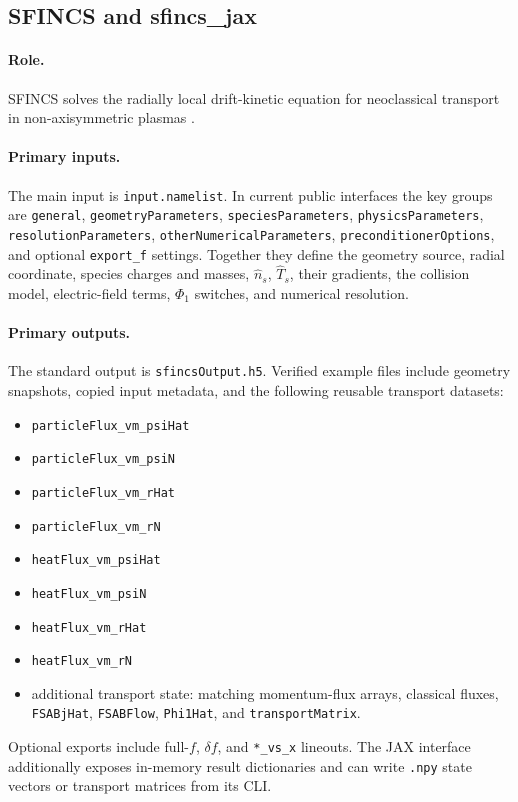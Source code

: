 \documentclass[11pt]{article}
\newcommand{\code}[1]{\texttt{#1}}
\begin{document}
\subsection{SFINCS and sfincs\_jax}

\paragraph{Role.}
SFINCS solves the radially local drift-kinetic equation for neoclassical
transport in non-axisymmetric plasmas \citep{Landreman2014SFINCS,Mollen2018,SFINCSRepo,SFINCSJaxRepo}.

\paragraph{Primary inputs.}
The main input is \code{input.namelist}. In current public interfaces the key
groups are \code{general}, \code{geometryParameters},
\code{speciesParameters}, \code{physicsParameters},
\code{resolutionParameters}, \code{otherNumericalParameters},
\code{preconditionerOptions}, and optional \code{export\_f} settings. Together
they define the geometry source, radial coordinate, species charges and masses,
\(\hat n_s\), \(\hat T_s\), their gradients, the collision model,
electric-field terms, \(\Phi_1\) switches, and numerical resolution.

\paragraph{Primary outputs.}
The standard output is \code{sfincsOutput.h5}. Verified example files include
geometry snapshots, copied input metadata, and the following reusable transport
datasets:
\begin{itemize}
  \item \code{particleFlux\_vm\_psiHat}
  \item \code{particleFlux\_vm\_psiN}
  \item \code{particleFlux\_vm\_rHat}
  \item \code{particleFlux\_vm\_rN}
  \item \code{heatFlux\_vm\_psiHat}
  \item \code{heatFlux\_vm\_psiN}
  \item \code{heatFlux\_vm\_rHat}
  \item \code{heatFlux\_vm\_rN}
  \item additional transport state: matching momentum-flux arrays, classical
  fluxes, \code{FSABjHat}, \code{FSABFlow}, \code{Phi1Hat}, and
  \code{transportMatrix}.
\end{itemize}
Optional exports include full-\(f\), \(\delta f\), and \code{*\_vs\_x}
lineouts. The JAX interface additionally exposes in-memory result dictionaries
and can write \code{.npy} state vectors or transport matrices from its CLI.
\end{document}
